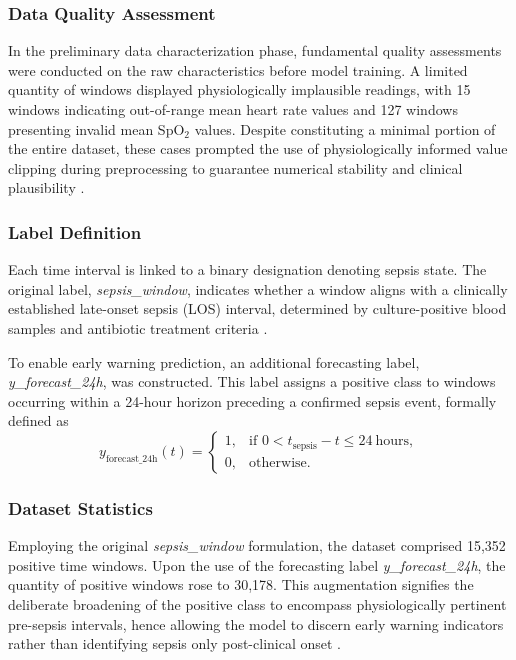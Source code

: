 \documentclass[conference]{IEEEtran}
\begin{document}
\subsubsection{Data Quality Assessment}
In the preliminary data characterization phase, fundamental quality assessments were conducted on the raw characteristics before model training. A limited quantity of windows displayed physiologically implausible readings, with 15 windows indicating out-of-range mean heart rate values and 127 windows presenting invalid mean SpO$_2$ values. Despite constituting a minimal portion of the entire dataset, these cases prompted the use of physiologically informed value clipping during preprocessing to guarantee numerical stability and clinical plausibility \cite{Saria2019SafeML}.

\subsubsection{Label Definition}
Each time interval is linked to a binary designation denoting sepsis state. The original label, \textit{sepsis\_window}, indicates whether a window aligns with a clinically established late-onset sepsis (LOS) interval, determined by culture-positive blood samples and antibiotic treatment criteria \cite{Moorman2023CardiorespiratorySepsis,cnn_psd_sepsis}.

To enable early warning prediction, an additional forecasting label, \textit{y\_forecast\_24h}, was constructed. This label assigns a positive class to windows occurring within a 24-hour horizon preceding a confirmed sepsis event, formally defined as
\begin{equation}
y_{\text{forecast\_24h}}(t) =
\begin{cases}
1, & \text{if } 0 < t_{\text{sepsis}} - t \leq 24~\text{hours}, \\
0, & \text{otherwise}.
\end{cases}
\end{equation}

\subsubsection{Dataset Statistics}
Employing the original \textit{sepsis\_window} formulation, the dataset comprised 15,352 positive time windows. Upon the use of the forecasting label \textit{y\_forecast\_24h}, the quantity of positive windows rose to 30,178. This augmentation signifies the deliberate broadening of the positive class to encompass physiologically pertinent pre-sepsis intervals, hence allowing the model to discern early warning indicators rather than identifying sepsis only post-clinical onset \cite{Moorman2023CardiorespiratorySepsis}.
\end{document}
